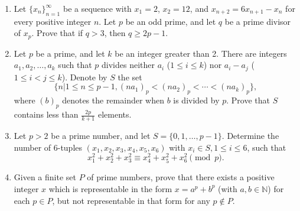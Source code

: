 \documentclass[12pt]{article}
\begin{document}
\begin{enumerate}
\item Let $\{x_n\}_{n=1}^\infty$ be a sequence with $x_1=2$, $x_2=12$,
  and $x_{n+2}=6x_{n+1}-x_n$ for every positive integer $n$.  Let $p$
  be an odd prime, and let $q$ be a prime divisor of $x_p$.  Prove
  that if $q>3$, then $q\geq 2p-1$.

\item Let $p$ be a prime, and let $k$ be an integer greater than 2.
  There are integers $a_1,a_2,\ldots,a_k$ such that $p$ divides
  neither $a_i$ ($1\leq i\leq k$) nor $a_i-a_j$ ($1\leq i<j\leq k$).
  Denote by $S$ the set \[\{n | 1\leq n\leq
  p-1,(na_1)_p<(na_2)_p<\cdots<(na_k)_p\},\] where $(b)_p$ denotes
  the remainder when $b$ is divided by $p$.  Prove that $S$ contains
  less than $\frac {2p}{k+1}$ elements.

\item Let $p>2$ be a prime number, and let $S=\{0,1,\ldots,p-1\}$.
  Determine the number of 6-tuples $(x_1,x_2,x_3,x_4,x_5,x_6)$ with
  $x_i\in S, 1\leq i\leq 6$, such that \[x_1^2+x_2^2+x_3^2\equiv
  x_4^2+x_5^2+x_6^2\pmod p.\]

\item Given a finite set $P$ of prime numbers, prove that there exists
  a positive integer $x$ which is representable in the form
  $x=a^p+b^p$ (with $a,b\in\mathbb N$) for each $p\in P$, but not
  representable in that form for any $p\notin P$.


\end{enumerate}
\end{document}
